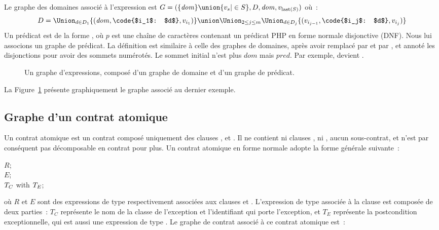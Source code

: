 Le {\strong graphe des domaines} associé à l'expression  est $G = (\{\mathit{dom}\} \union \{v_s \vert \in S\},
D, \mathit{dom}, v_{\mathrm{last}(S)})$ où~:
%
$$D = \Union_{d \in D_1} \{(\mathit{dom}, \code{$i_1$: $d$}, v_{i_1})\} \union
      \Union_{2 \leq j \leq m}
      \Union_{d \in D_j} \{(v_{i_{j - 1}}, \code{$i_j$: $d$}, v_{i_{j}})\}$$
%
Un prédicat est de la forme , où $p$ est une chaîne de caractères
contenant un prédicat PHP en forme normale disjonctive (DNF). Nous lui associons
un {\strong graphe de prédicat}. La définition est similaire à celle des graphes
de domaines, après avoir remplacé \code{\&\&} par  et \code{||} par
, et annoté les disjonctions pour avoir des sommets numérotés. Le
sommet initial n'est plus $\mathit{dom}$ mais $\mathit{pred}$. Par exemple,
 devient .

\begin{figure}


\caption{\label{figure:test:expression_graph} Un graphe d'expressions, composé
d'un graphe de domaine et d'un graphe de prédicat.}

\end{figure}

La Figure~\ref{figure:test:expression_graph} présente graphiquement le graphe
associé au dernier exemple.

\subsection{Graphe d'un contrat atomique}
\label{subsection:test:atomic_graph}

Un {\strong contrat atomique} est un contrat composé uniquement des clauses
\arequires, \aensures et \athrowable. Il ne contient ni clauses \abehavior, ni
\adefault, \ie aucun sous-contrat, et n'est par conséquent pas décomposable en
contrat pour plus. Un contrat atomique en forme normale adopte la forme générale
suivante~:
%
\begin{pre}
\arequires  \(R\); \\
\aensures   \(E\); \\
\athrowable \(T\sb{C}\) with \(T\sb{E}\);
\end{pre}
%
où $R$ et $E$ sont des expressions de type  respectivement
associées aux clauses \arequires et \aensures. L'expression de type
 associée à la clause \athrowable est composée de
deux parties~: $T_C$ représente le nom de la classe de l'exception et
l'identifiant qui porte l'exception, et $T_E$ représente la postcondition
exceptionnelle, qui est aussi une expression de type . Le
graphe de contrat associé à ce contrat atomique est~:

